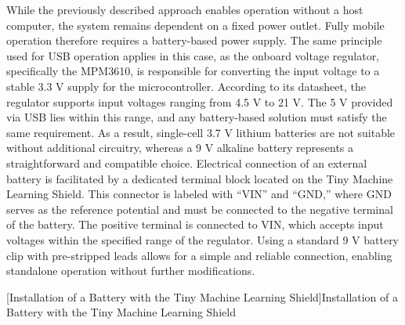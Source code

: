 While the previously described approach enables operation without a host computer, the system remains dependent on a fixed power outlet. Fully mobile operation therefore requires a battery-based power supply. The same principle used for USB operation applies in this case, as the onboard voltage regulator, specifically the MPM3610, is responsible for converting the input voltage to a stable 3.3 V supply for the microcontroller. According to its datasheet, the regulator supports input voltages ranging from 4.5 V to 21 V. The 5 V provided via USB lies within this range, and any battery-based solution must satisfy the same requirement. As a result, single-cell 3.7 V lithium batteries are not suitable without additional circuitry, whereas a 9 V alkaline battery represents a straightforward and compatible choice. Electrical connection of an external battery is facilitated by a dedicated terminal block located on the Tiny Machine Learning Shield. This connector is labeled with “VIN” and “GND,” where GND serves as the reference potential and must be connected to the negative terminal of the battery. The positive terminal is connected to VIN, which accepts input voltages within the specified range of the regulator. Using a standard 9 V battery clip with pre-stripped leads allows for a simple and reliable connection, enabling standalone operation without further modifications.



\begin{center}
	
	
	[Installation of a Battery with the Tiny Machine Learning Shield]{Installation of a Battery with the Tiny Machine Learning Shield}
	\label{fig:BatteryShield}
\end{center}


